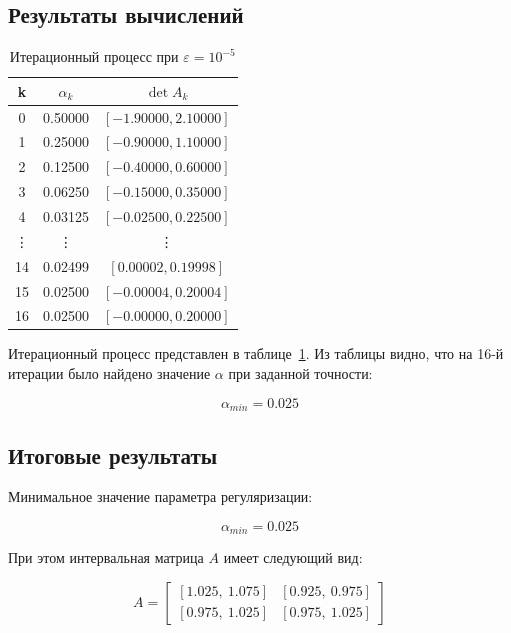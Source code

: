 \documentclass{article}
\begin{document}
  \clearpage

  \subsection{Результаты вычислений}

  \begin{table}[htbp!]
    \centering
    \renewcommand{\arraystretch}{1.2}
    \begin{tabular}{|c|c|c|}
      \hline
      k & \( \alpha_k \) & \( \det A_k \) \\
      \hline
      0 & 0.50000 & \([-1.90000, 2.10000]\) \\
      \hline
      1 & 0.25000 & \([-0.90000, 1.10000]\) \\
      \hline
      2 & 0.12500 & \([-0.40000, 0.60000]\) \\
      \hline
      3 & 0.06250 & \([-0.15000, 0.35000]\) \\
      \hline
      4 & 0.03125 & \([-0.02500, 0.22500]\) \\

      \hline
      \vdots & \vdots & \vdots \\
      \hline

      14 & 0.02499 & \([0.00002, 0.19998]\) \\
      \hline
      15 & 0.02500 & \([-0.00004, 0.20004]\) \\
      \hline
      16 & 0.02500 & \([-0.00000, 0.20000]\) \\
      \hline
    \end{tabular}
    \caption{Итерационный процесс при \( \varepsilon = 10^{-5} \)}
    \label{table:iterations}
  \end{table}

  Итерационный процесс представлен в таблице~\ref{table:iterations}.
  Из таблицы видно, что на 16-й итерации было найдено значение \( \alpha \)
  при заданной точности:

  \[ \alpha_{min} = 0.025 \]

  \subsection{Итоговые результаты}

  Минимальное значение параметра регуляризации:

  \[ \alpha_{min} = 0.025 \]

  При этом интервальная матрица \(A\) имеет следующий вид:

  \[
    A = \begin{bmatrix}
      [1.025,\ 1.075] & [0.925,\ 0.975] \\
      [0.975,\ 1.025] & [0.975,\ 1.025]
    \end{bmatrix}
  \]
\end{document}
